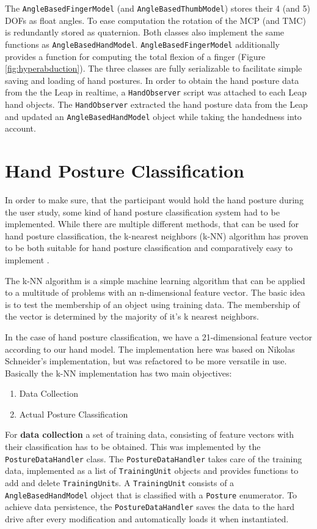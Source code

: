 The \texttt{AngleBasedFingerModel} (and \texttt{AngleBasedThumbModel}) stores their 4 (and 5) DOFs as float angles. To ease computation the rotation of the MCP (and TMC) is redundantly stored as quaternion. Both classes also implement the same functions as \texttt{AngleBasedHandModel}. \texttt{AngleBasedFingerModel} additionally provides a function for computing the total flexion of a finger (Figure \ref{fig:hyperabduction}). The three classes are fully serializable to facilitate simple saving and loading of hand postures.
In order to obtain the hand posture data from the the Leap in realtime, a \texttt{HandObserver} script was attached to each Leap hand objects. The \texttt{HandObserver} extracted the hand posture data from the Leap and updated an \texttt{AngleBasedHandModel} object while taking the handedness into account.

\section{Hand Posture Classification}

In order to make sure, that the participant would hold the hand posture during the user study, some kind of hand posture classification system had to be implemented. While there are multiple different methods, that can be used for hand posture classification, the k-nearest neighbors (k-NN) algorithm has proven to be both suitable for hand posture classification and comparatively easy to implement \cite{gardner20143d}. 

The k-NN algorithm is a simple machine learning algorithm that can be applied to a multitude of problems with an n-dimensional feature vector. The basic idea is to test the membership of an object using training data. The membership of the vector is determined by the majority of it's k nearest neighbors. 

In the case of hand posture classification, we have a 21-dimensional feature vector according to our hand model. The implementation here was based on Nikolas Schneider's implementation, but was refactored to be more versatile in use. Basically the k-NN implementation has two main objectives:

\begin{enumerate}
	\item Data Collection
	\item Actual Posture Classification
\end{enumerate}

For \textbf{data collection} a set of training data, consisting of feature vectors with their classification has to be obtained. This was implemented by the \texttt{PostureDataHandler} class. The \texttt{PostureDataHandler} takes care of the training data, implemented as a list of \texttt{TrainingUnit} objects and provides functions to add and delete \texttt{TrainingUnit}s. A \texttt{TrainingUnit} consists of a \texttt{AngleBasedHandModel} object that is classified with a \texttt{Posture} enumerator. To achieve data persistence, the \texttt{PostureDataHandler} saves the data to the hard drive after every modification and automatically loads it when instantiated.

